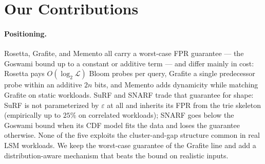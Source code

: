 \section{Our Contributions}
\label{sec:our-contributions}

\paragraph{Positioning.}
Rosetta, Grafite, and Memento all carry a worst-case FPR guarantee ---
the Goswami bound up to a constant or additive term --- and differ
mainly in cost: Rosetta pays $O(\log_2 \mathcal{L})$ Bloom probes per
query, Grafite a single predecessor probe within an additive $2n$ bits,
and Memento adds dynamicity while matching Grafite on static workloads.
SuRF and SNARF trade that guarantee for shape: SuRF is not
parameterized by $\varepsilon$ at all and inherits its FPR from the
trie skeleton (empirically up to $25\%$ on correlated workloads);
SNARF goes below the Goswami bound when its CDF model fits the data
and loses the guarantee otherwise.
None of the five exploits the cluster-and-gap structure common in real
LSM workloads.
We keep the worst-case guarantee of the Grafite line and add a
distribution-aware mechanism that beats the bound on realistic inputs.

